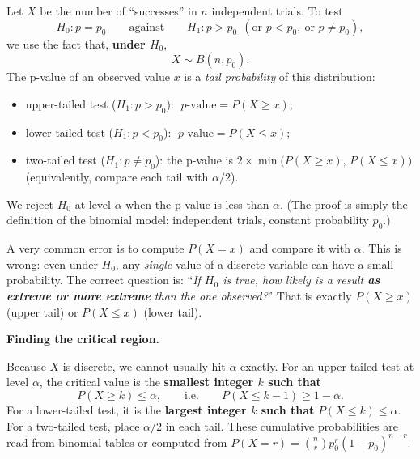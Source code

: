 \documentclass[11pt]{article}
\newcommand{\cle}[1]{{\popxbold\color{popdark}#1}}
\begin{document}
\begin{propriete}
Let $X$ be the number of ``successes'' in $n$ independent trials. To test
\[ H_0 : p = p_0 \qquad \text{against} \qquad H_1 : p > p_0 \ \ (\text{or } p < p_0,\ \text{or } p \neq p_0), \]
we use the fact that, \textbf{under $H_0$},
\[ X \sim B(n, p_0). \]
The \cle{p-value} of an observed value $x$ is a \emph{tail probability} of this distribution:
\begin{itemize}
\item upper-tailed test ($H_1 : p > p_0$): $\;p\text{-value} = P(X \geq x)$;
\item lower-tailed test ($H_1 : p < p_0$): $\;p\text{-value} = P(X \leq x)$;
\item two-tailed test ($H_1 : p \neq p_0$): the p-value is $2 \times \min\bigl(P(X \geq x),\, P(X \leq x)\bigr)$ (equivalently, compare each tail with $\alpha/2$).
\end{itemize}
We reject $H_0$ at level $\alpha$ when the p-value is less than $\alpha$. (The proof is simply the definition of the binomial model: independent trials, constant probability $p_0$.)
\end{propriete}

\begin{attention}
A very common error is to compute $P(X = x)$ and compare it with $\alpha$. This is wrong: even under $H_0$, any \emph{single} value of a discrete variable can have a small probability. The correct question is: ``\emph{If $H_0$ is true, how likely is a result \textbf{as extreme or more extreme} than the one observed?}'' That is exactly $P(X \geq x)$ (upper tail) or $P(X \leq x)$ (lower tail).
\end{attention}

\textbf{Finding the critical region.}\par
Because $X$ is discrete, we cannot usually hit $\alpha$ exactly. For an upper-tailed test at level $\alpha$, the \cle{critical value} is the \textbf{smallest integer $k$ such that}
\[ P(X \geq k) \leq \alpha, \qquad \text{i.e.} \qquad P(X \leq k-1) \geq 1 - \alpha. \]
For a lower-tailed test, it is the \textbf{largest integer $k$ such that} $P(X \leq k) \leq \alpha$. For a two-tailed test, place $\alpha/2$ in each tail. These cumulative probabilities are read from binomial tables or computed from $P(X = r) = \binom{n}{r} p_0^{r} (1-p_0)^{n-r}$.
\end{document}
